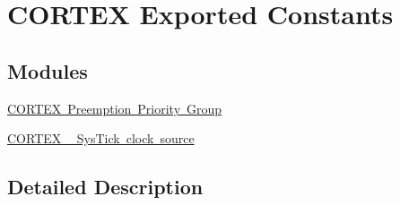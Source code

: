 \hypertarget{group___c_o_r_t_e_x___exported___constants}{}\section{C\+O\+R\+T\+EX Exported Constants}
\label{group___c_o_r_t_e_x___exported___constants}
\subsection*{Modules}
\begin{DoxyCompactItemize}
\item 
\mbox{\hyperlink{group___c_o_r_t_e_x___preemption___priority___group}{C\+O\+R\+T\+E\+X Preemption Priority Group}}
\item 
\mbox{\hyperlink{group___c_o_r_t_e_x___sys_tick__clock__source}{C\+O\+R\+T\+E\+X \+\_\+\+Sys\+Tick clock source}}
\end{DoxyCompactItemize}


\subsection{Detailed Description}
